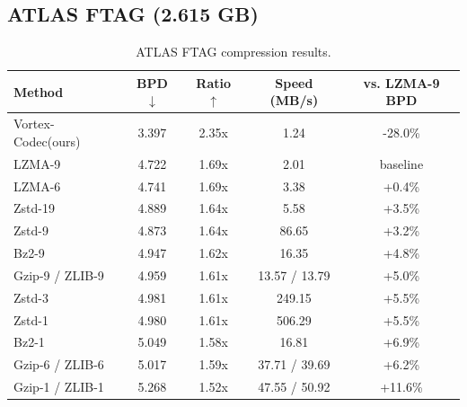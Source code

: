\documentclass[10pt,twocolumn]{article}
\newcommand{\codec}{Vortex-Codec}
\begin{document}
\subsection{ATLAS FTAG (2.615 GB)}
\begin{table}[t]
\centering
\small
\caption{ATLAS FTAG compression results.}
\label{tab:atlas_results}
\begin{tabular}{@{}lcccc@{}}
\toprule
Method & BPD $\downarrow$ & Ratio $\uparrow$ & Speed (MB/s) & vs. LZMA-9 BPD \\
\midrule
\codec (ours) & 3.397 & 2.35x & 1.24 & -28.0\% \\
LZMA-9 & 4.722 & 1.69x & 2.01 & baseline \\
LZMA-6 & 4.741 & 1.69x & 3.38 & +0.4\% \\
Zstd-19 & 4.889 & 1.64x & 5.58 & +3.5\% \\
Zstd-9 & 4.873 & 1.64x & 86.65 & +3.2\% \\
Bz2-9 & 4.947 & 1.62x & 16.35 & +4.8\% \\
Gzip-9 / ZLIB-9 & 4.959 & 1.61x & 13.57 / 13.79 & +5.0\% \\
Zstd-3 & 4.981 & 1.61x & 249.15 & +5.5\% \\
Zstd-1 & 4.980 & 1.61x & 506.29 & +5.5\% \\
Bz2-1 & 5.049 & 1.58x & 16.81 & +6.9\% \\
Gzip-6 / ZLIB-6 & 5.017 & 1.59x & 37.71 / 39.69 & +6.2\% \\
Gzip-1 / ZLIB-1 & 5.268 & 1.52x & 47.55 / 50.92 & +11.6\% \\
\bottomrule
\end{tabular}
\end{table}
\end{document}
